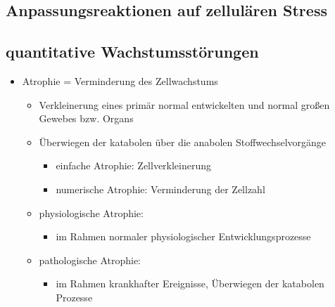 \begin{it>emize}
\subsection{Anpassungsreaktionen auf zellulären Stress}

\subsection{quantitative Wachstumsstörungen}
\begin{itemize}
\item Atrophie = Verminderung des Zellwachstums
\begin{itemize}
\item Verkleinerung eines primär normal entwickelten und normal großen Gewebes bzw. Organs
\item Überwiegen der katabolen über die anabolen Stoffwechselvorgänge
\begin{itemize}
\item einfache Atrophie: Zellverkleinerung
\item numerische Atrophie: Verminderung der Zellzahl
\end{itemize}
\item physiologische Atrophie:
\begin{itemize}
\item im Rahmen normaler physiologischer Entwicklungsprozesse
\end{itemize}
\item pathologische Atrophie:
\begin{itemize}
\item im Rahmen krankhafter Ereignisse, Überwiegen der katabolen Prozesse
\end{itemize}
\end{itemize}
\end{itemize}


\end{it>emize}
